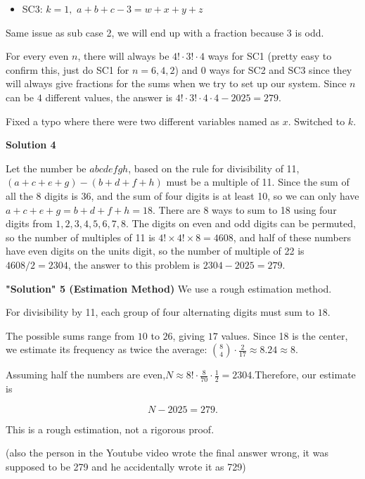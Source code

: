 \begin{enumerate}
 
            \begin{itemize}
        \item SC3: $k = 1,$ $a + b + c - 3  = w + x + y + z$
            \end{itemize}
            Same issue as sub case 2, we will end up with a fraction because $3$ is odd. 

 For every even $n$, there will always be $4! \cdot 3! \cdot 4$ ways for SC1 (pretty easy to confirm this, just do SC1 for $n = 6,4,2$) and $0$ ways for SC2 and SC3 since they will always give fractions for the sums when we try to set up our system. Since $n$ can be $4$ different values, the answer is $4! \cdot 3! \cdot 4 \cdot 4 - 2025 = \boxed{279}.$

 Fixed a typo where there were two different variables named as $x$. Switched to $k$.

 



\textbf{Solution 4}

Let the number be $abcdefgh$, based on the rule for divisibility of 11, $(a + c + e + g) - (b+d+f+h)$ must be a multiple of 11. Since the sum of all the 8 digits is 36, and the sum of four digits is at least 10, so we can only have $a+c+e+g = b+d+f+h = 18$. There are 8 ways to sum to 18 using four digits from $1,2,3,4,5,6,7,8$. The digits on even and odd digits can be permuted, so the number of multiples of 11 is  $4! \times 4!\times 8 = 4608$, and half of these numbers have even digits on the units digit, so the number of multiple of 22 is $4608/2 = 2304$, the answer to this problem is $2304 - 2025 = \boxed{279}$.

 \textbf{"Solution" 5 (Estimation Method)} We use a rough estimation method.

 For divisibility by 11, each group of four alternating digits must sum to $18$.

 The possible sums range from $10$ to $26$, giving $17$ values. Since 18 is the center, we estimate its frequency as twice the average: $\binom{8}{4}\cdot\frac{2}{17}\approx8.24\approx8.$

 Assuming half the numbers are even,$N\approx8!\cdot\frac{8}{70}\cdot\frac12=2304.$Therefore, our estimate is

 
 \[\boxed{N-2025=279}.\]

 This is a rough estimation, not a rigorous proof.

 (also the person in the Youtube video wrote the final answer wrong, it was supposed to be 279 and he accidentally wrote it as 729)


\end{enumerate}
